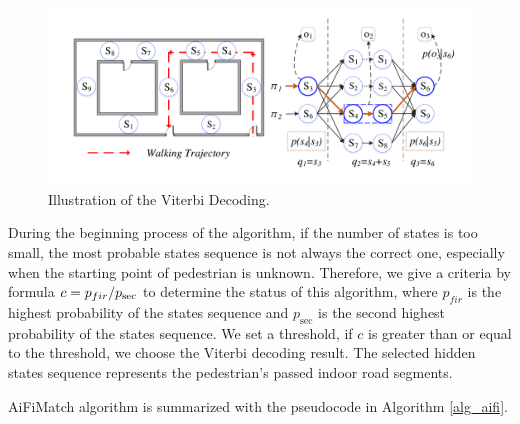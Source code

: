 \documentclass{llncs}
\begin{document}
\begin{figure}[!htbp]
	\centering
	\includegraphics[width=4.6in]{AiFiMatch-Viterbi}
	\caption{Illustration of the Viterbi Decoding.}
	\label{fig-viterbi}
\end{figure}

During the beginning process of the algorithm, if the number of states is too small, the most probable states sequence is not always the correct one, especially when the starting point of pedestrian is unknown. Therefore, we give a criteria by formula $c = {{{p_{fir}}} \mathord{\left/
		{\vphantom {{{p_{fir}}} {{p_{\sec }}}}} \right.
		\kern-\nulldelimiterspace} {{p_{\sec }}}}$ to determine the status of this algorithm, where ${p_{fir}}$ is the highest probability of the states sequence and ${p_{\sec }}$ is the second highest probability of the states sequence. We set a threshold, if $c$ is greater than or equal to the threshold, we choose the Viterbi decoding result. The selected hidden states sequence represents the pedestrian's passed indoor road segments.

AiFiMatch algorithm is summarized with the pseudocode in Algorithm \ref{alg_aifi}.  
\end{document}
